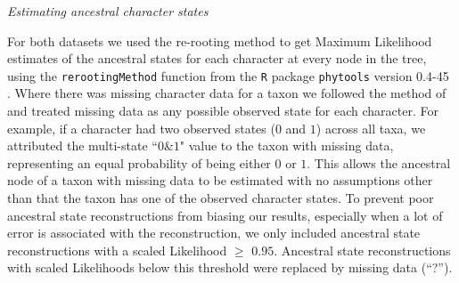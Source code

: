 \documentclass[12pt,letterpaper]{article}
\renewcommand{\subsection}[1]{%
\bigskip
\begin{center}
\begin{large}
\normalfont\itshape #1
\end{large}
\end{center}}
\begin{document}
\subsection{Estimating ancestral character states}
For both datasets we used the re-rooting method \citep{Yang01121995,Garland2000} to get Maximum Likelihood estimates of the ancestral states for each character at every node in the tree, using the \texttt{rerootingMethod} function from the \texttt{R} package \texttt{phytools} version 0.4-45 \citep{phytools,R}.
Where there was missing character data for a taxon we followed the method of \cite{Claddis} and treated missing data as any possible observed state for each character.
For example, if a character had two observed states ($0$ and $1$) across all taxa, we attributed the multi-state ``$0$\&$1$" value to the taxon with missing data, representing an equal probability of being either $0$ or $1$.
This allows the ancestral node of a taxon with missing data to be estimated with no assumptions other than that the taxon has one of the observed character states.
To prevent poor ancestral state reconstructions from biasing our results, especially when a lot of error is associated with the reconstruction, we only included ancestral state reconstructions with a scaled Likelihood $\geq$ $0.95$.
Ancestral state reconstructions with scaled Likelihoods below this threshold were replaced by missing data (``?'').
\end{document}
